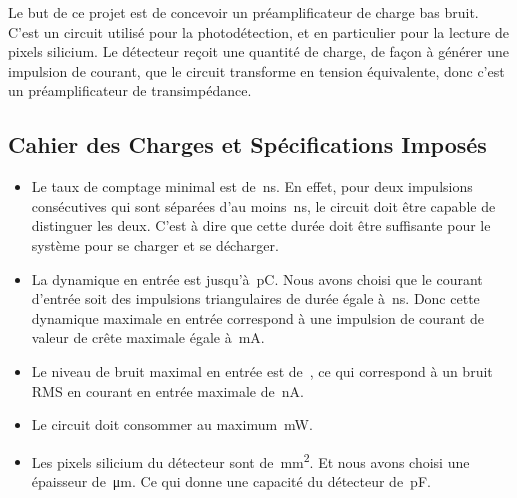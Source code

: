 \documentclass[a4paper,12pt]{article}
\numberwithin{equation}{section}
\newcommand{\?}{\stackrel{?}{=}}
\newcommand{\sis}[2]{\complexnum{#1}\,\si[per-mode=symbol]{#2}}
\begin{document}
Le but de ce projet est de concevoir un préamplificateur de charge bas bruit. C'est un circuit utilisé pour la photodétection, et en particulier pour la lecture de pixels silicium. Le détecteur reçoit une quantité de charge, de façon à générer une impulsion de courant, que le circuit transforme en tension équivalente, donc c'est un préamplificateur de transimpédance.

\subsection{Cahier des Charges et Spécifications Imposés}

\begin{itemize}
    \item Le taux de comptage minimal est de \sis{50}{\nano\second}. En effet, pour deux impulsions consécutives qui sont séparées d'au moins \sis{50}{\nano\second}, le circuit doit être capable de distinguer les deux. C'est à dire que cette durée doit être suffisante pour le système pour se charger et se décharger. 

    \item La dynamique en entrée est jusqu'à \sis{1}{\pico\coulomb}. Nous avons choisi que le courant d'entrée soit des impulsions triangulaires de durée égale à \sis{2}{\nano\second}. Donc cette dynamique maximale en entrée correspond à une impulsion de courant de valeur de crête maximale égale à \sis{1}{\milli\ampere}.

    \item Le niveau de bruit maximal en entrée est de \sis{1000}{\electron}, ce qui correspond à un bruit RMS en courant en entrée maximale de \sis{160.22}{\nano\ampere}.

    \item Le circuit doit consommer au maximum \sis{2}{\milli\watt}.

    \item Les pixels silicium du détecteur sont de \sis{20}{\milli\meter\squared}. Et nous avons choisi une épaisseur de \sis{470}{\micro\meter}. Ce qui donne une capacité du détecteur de \sis{4.5}{\pico\farad}. 


\end{itemize}
\end{document}
